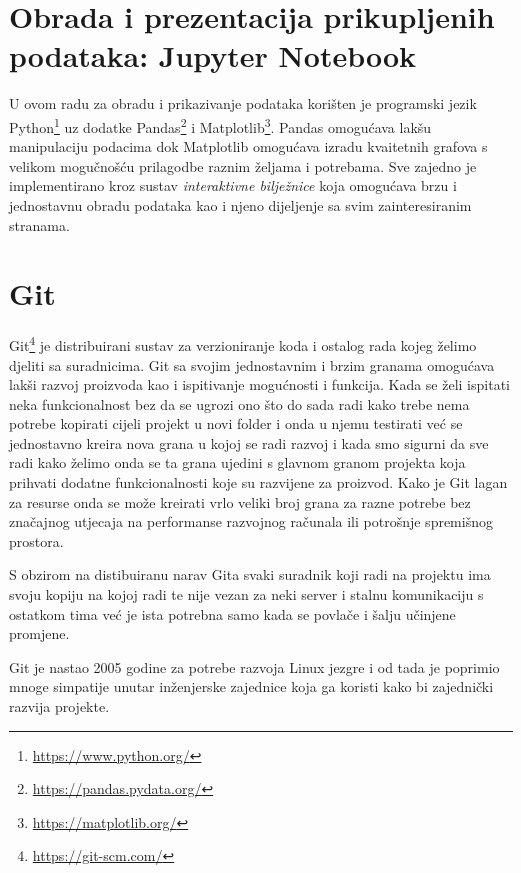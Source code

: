 \section{Obrada i prezentacija prikupljenih podataka: Jupyter Notebook}
U ovom radu za obradu i prikazivanje podataka korišten je programski jezik Python\footnote{\href{https://www.python.org/}{https://www.python.org/}} uz dodatke Pandas\footnote{\href{https://pandas.pydata.org/}{https://pandas.pydata.org/}} i Matplotlib\footnote{\href{https://matplotlib.org/}{https://matplotlib.org/}}.
Pandas omogućava lakšu manipulaciju podacima dok Matplotlib omogućava izradu kvaitetnih grafova s velikom mogučnošću prilagodbe raznim željama i potrebama.
Sve zajedno je implementirano kroz sustav \emph{interaktivne bilježnice} koja omogućava brzu i jednostavnu obradu podataka kao i njeno dijeljenje sa svim zainteresiranim stranama.

\section{Git}
Git\footnote{\href{https://git-scm.com/}{https://git-scm.com/}} je distribuirani sustav za verzioniranje koda i ostalog rada kojeg želimo djeliti sa suradnicima.
Git sa svojim jednostavnim i brzim granama omogućava lakši razvoj proizvoda kao i ispitivanje mogućnosti i funkcija.
Kada se želi ispitati neka funkcionalnost bez da se ugrozi ono što do sada radi kako trebe nema potrebe kopirati cijeli projekt u novi folder i onda u njemu testirati već se jednostavno kreira nova grana u kojoj se radi razvoj i kada smo sigurni da sve radi kako želimo onda se ta grana ujedini s glavnom granom projekta koja prihvati dodatne funkcionalnosti koje su razvijene za proizvod.
Kako je Git lagan za resurse onda se može kreirati vrlo veliki broj grana za razne potrebe bez značajnog utjecaja na performanse razvojnog računala ili potrošnje spremišnog prostora.

S obzirom na distibuiranu narav Gita svaki suradnik koji radi na projektu ima svoju kopiju na kojoj radi te nije vezan za neki server i stalnu komunikaciju s ostatkom tima već je ista potrebna samo kada se povlače i šalju učinjene promjene.

Git je nastao 2005 godine za potrebe razvoja Linux jezgre i od tada je poprimio mnoge simpatije unutar inženjerske zajednice koja ga koristi kako bi zajednički razvija projekte.

